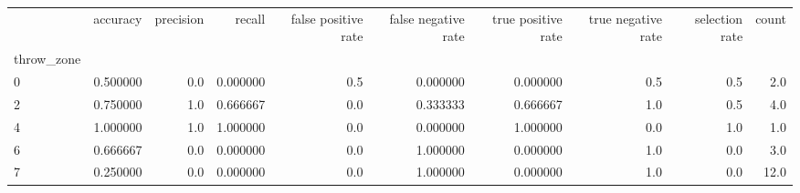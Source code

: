 \begin{tabular}{lrrrrrrrrr}
\toprule
{} &  accuracy &  precision &    recall &  false positive rate &  false negative rate &  true positive rate &  true negative rate &  selection rate &  count \\
throw\_zone &           &            &           &                      &                      &                     &                     &                 &        \\
\midrule
0          &  0.500000 &        0.0 &  0.000000 &                  0.5 &             0.000000 &            0.000000 &                 0.5 &             0.5 &    2.0 \\
2          &  0.750000 &        1.0 &  0.666667 &                  0.0 &             0.333333 &            0.666667 &                 1.0 &             0.5 &    4.0 \\
4          &  1.000000 &        1.0 &  1.000000 &                  0.0 &             0.000000 &            1.000000 &                 0.0 &             1.0 &    1.0 \\
6          &  0.666667 &        0.0 &  0.000000 &                  0.0 &             1.000000 &            0.000000 &                 1.0 &             0.0 &    3.0 \\
7          &  0.250000 &        0.0 &  0.000000 &                  0.0 &             1.000000 &            0.000000 &                 1.0 &             0.0 &   12.0 \\
\bottomrule
\end{tabular}
